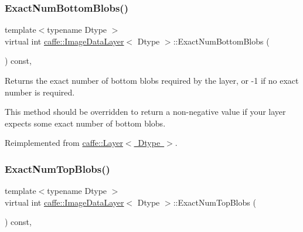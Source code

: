 \mbox{\label{classcaffe_1_1_image_data_layer_a6776c86faf14e35ae7be9848c7012aa5}} 
\subsubsection{\texorpdfstring{Exact\+Num\+Bottom\+Blobs()}{ExactNumBottomBlobs()}\hspace{0.1cm}{\footnotesize\ttfamily [2/2]}}
{\footnotesize\ttfamily template$<$typename Dtype $>$ \\
virtual int \mbox{\hyperlink{classcaffe_1_1_image_data_layer}{caffe\+::\+Image\+Data\+Layer}}$<$ Dtype $>$\+::Exact\+Num\+Bottom\+Blobs (\begin{DoxyParamCaption}{ }\end{DoxyParamCaption}) const\hspace{0.3cm}{\ttfamily [inline]}, {\ttfamily [virtual]}}



Returns the exact number of bottom blobs required by the layer, or -\/1 if no exact number is required. 

This method should be overridden to return a non-\/negative value if your layer expects some exact number of bottom blobs. 

Reimplemented from \mbox{\hyperlink{classcaffe_1_1_layer_a8e5ee0494d85f5f55fc4396537cbc60f}{caffe\+::\+Layer$<$ Dtype $>$}}.

\mbox{\label{classcaffe_1_1_image_data_layer_aa9182d46877b8514fca86e3588249567}} 
\subsubsection{\texorpdfstring{Exact\+Num\+Top\+Blobs()}{ExactNumTopBlobs()}\hspace{0.1cm}{\footnotesize\ttfamily [1/2]}}
{\footnotesize\ttfamily template$<$typename Dtype $>$ \\
virtual int \mbox{\hyperlink{classcaffe_1_1_image_data_layer}{caffe\+::\+Image\+Data\+Layer}}$<$ Dtype $>$\+::Exact\+Num\+Top\+Blobs (\begin{DoxyParamCaption}{ }\end{DoxyParamCaption}) const\hspace{0.3cm}{\ttfamily [inline]}, {\ttfamily [virtual]}}



